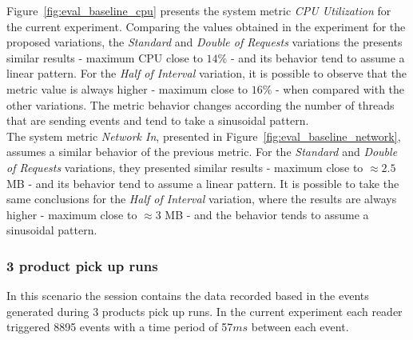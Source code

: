 Figure~\ref{fig:eval_baseline_cpu} presents the system metric \textit{CPU Utilization} for the current
experiment. Comparing the values obtained in the experiment for the proposed variations, the
\textit{Standard} and \textit{Double of Requests} variations the presents similar results -
maximum \gls{CPU} close to $14\%$ - and its behavior tend to assume a linear pattern. For the \textit{Half of Interval}
variation, it is possible to observe that the metric value is always higher - maximum close to $16\%$ -
when compared with the other variations. The metric behavior changes according the number of threads
that are sending events and tend to take a sinusoidal pattern.\\

The system metric \textit{Network In}, presented in Figure~\ref{fig:eval_baseline_network}, assumes a
similar behavior of the previous metric. For the \textit{Standard} and \textit{Double of Requests} variations,
they presented similar results - maximum close to $\approx2.5$ \gls{MB} - and its behavior tend to assume a linear
pattern. It is possible to take the same conclusions for the \textit{Half of Interval} variation,
where the results are always higher - maximum close to $\approx3$ \gls{MB} - and the behavior tends to assume
a sinusoidal pattern.

\subsubsection{3 product pick up runs}
\label{subs:eval_exp_data_3laps}
In this scenario the session contains the data recorded based in the events generated during 3 products
pick up runs. In the current experiment each reader triggered 8895 events with a time period of 57$ms$
between each event.\\


